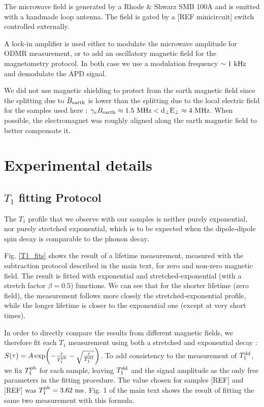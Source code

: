 \documentclass[preprintnumbers,amsmath,amssymb,onecolumn,12pt]{revtex4-2}\usepackage{graphicx}%
\begin{document}
The microwave field is generated by a Rhode \& Shwarz SMB 100A and is emitted with a handmade loop antenna. The field is gated by a [REF minicircuit] switch controlled externally.

A lock-in amplifier is used either to modulate the microwave amplitude for ODMR measurement, or to add an oscillatory magnetic field for the magnetometry protocol. In both case we use a modulation frequency $\sim 1\ \rm kHz$ and demodulate the APD signal.

We did not use magnetic shielding to protect from the earth magnetic field since the splitting due to  $B_{\rm earth}$ is lower than the splitting due to the local electric field for the samples used here : $ \gamma_e B_{\rm earth} \approx 1.5\ \rm MHz < d_\perp E_\perp \approx 4\ \rm MHz$. 
When possible, the electromagnet was roughly aligned along the earth magnetic field to better compensate it.
\section{Experimental details}
\subsection{$T_1$ fitting Protocol}
The $T_1$ profile that we observe with our samples is neither purely exponential, nor purely stretched exponential, which is to be expected when the dipole-dipole spin decay is comparable to the phonon decay.

Fig. \ref{T1_fits} shows the result of a lifetime measurement, measured with the subtraction protocol described in the main text, for zero and non-zero magnetic field. The result is fitted with exponential and stretched-exponential (with a stretch factor $\beta=0.5$) functions. We can see that for the shorter lifetime (zero field), the measurement follows more closely the stretched-exponential profile, while the longer lifetime is closer to the exponential one (except at very short times).

In order to directly compare the results from different magnetic fields, we therefore fit each $T_1$ measurement using both a stretched and exponential decay : $S(\tau)=A \exp (-\frac{\tau}{T_1^{\rm ph}} -\sqrt{\frac{\tau}{T_1^{\rm dd}}})$.
To add consistency to the measurement of $T_1^{\rm dd}$, we fix $T_1^{\rm ph}$ for each sample, leaving $T_1^{\rm dd}$ and the signal amplitude as the only free parameters in the fitting procedure. The value chosen for samples [REF] and [REF] was $T_1^{\rm ph}=3.62\ \rm ms$. Fig. 1 of the main text shows the result of fitting the same two measurement with this formula.
\end{document}

